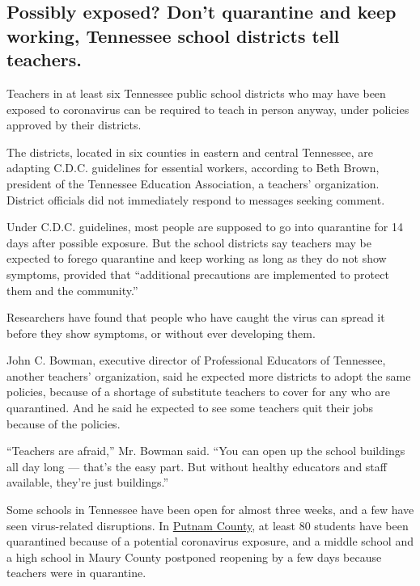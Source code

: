 \hypertarget{possibly-exposed-dont-quarantine-and-keep-working-tennessee-school-districts-tell-teachers}{%
\subsection{Possibly exposed? Don't quarantine and keep working,
Tennessee school districts tell
teachers.}\label{possibly-exposed-dont-quarantine-and-keep-working-tennessee-school-districts-tell-teachers}}

Teachers in at least six Tennessee public school districts who may have
been exposed to coronavirus can be required to teach in person anyway,
under policies approved by their districts.

The districts, located in six counties in eastern and central Tennessee,
are adapting C.D.C. guidelines for essential workers, according to Beth
Brown, president of the Tennessee Education Association, a teachers'
organization. District officials did not immediately respond to messages
seeking comment.

Under C.D.C. guidelines, most people are supposed to go into quarantine
for 14 days after possible exposure. But the school districts say
teachers may be expected to forego quarantine and keep working as long
as they do not show symptoms, provided that ``additional precautions are
implemented to protect them and the community.''

Researchers have found that people who have caught the virus can spread
it before they show symptoms, or without ever developing them.

John C. Bowman, executive director of Professional Educators of
Tennessee, another teachers' organization, said he expected more
districts to adopt the same policies, because of a shortage of
substitute teachers to cover for any who are quarantined. And he said he
expected to see some teachers quit their jobs because of the policies.

``Teachers are afraid,'' Mr. Bowman said. ``You can open up the school
buildings all day long --- that's the easy part. But without healthy
educators and staff available, they're just buildings.''

Some schools in Tennessee have been open for almost three weeks, and a
few have seen virus-related disruptions. In
\href{https://www.tennessean.com/story/news/education/2020/08/09/80-students-quarantined-putnam-county-tn-after-exposure-covid-19/3330778001/}{Putnam
County}, at least 80 students have been quarantined because of a
potential coronavirus exposure, and a middle school and a high school in
Maury County postponed reopening by a few days because teachers were in
quarantine.

